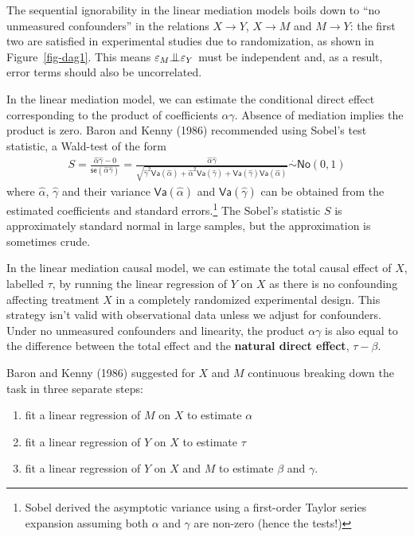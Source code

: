 \documentclass[
  11pt,
  letterpaper,
]{scrbook}
\providecommand{\tightlist}{%
  \setlength{\itemsep}{0pt}\setlength{\parskip}{0pt}}\usepackage{longtable,booktabs,array}
\theoremstyle{definition}
\theoremstyle{remark}
\begin{document}
The sequential ignorability in the linear mediation models boils down to
``no unmeasured confounders'' in the relations \(X \to Y\), \(X \to M\)
and \(M \to Y\): the first two are satisfied in experimental studies due
to randomization, as shown in Figure~\ref{fig-dag1}. This means
\(\varepsilon_M {\perp\mkern-10mu\perp} \varepsilon_Y\) must be
independent and, as a result, error terms should also be uncorrelated.

In the linear mediation model, we can estimate the conditional direct
effect corresponding to the product of coefficients \(\alpha\gamma\).
Absence of mediation implies the product is zero. Baron and Kenny (1986)
recommended using Sobel's test statistic, a Wald-test of the form
\begin{align*}
S  = \frac{\widehat{\alpha}\widehat{\gamma} - 0}{\mathsf{se}(\widehat{\alpha}\widehat{\gamma})} =  \frac{\widehat{\alpha}\widehat{\gamma}}{\sqrt{\widehat{\gamma}^2\mathsf{Va}(\widehat{\alpha}) + \widehat{\alpha}^2\mathsf{Va}(\widehat{\gamma}) + \mathsf{Va}(\widehat{\gamma})\mathsf{Va}(\widehat{\alpha})}} \stackrel{\cdot}{\sim}\mathsf{No}(0,1)
\end{align*} where \(\widehat{\alpha}\), \(\widehat{\gamma}\) and their
variance \(\mathsf{Va}(\widehat{\alpha})\) and
\(\mathsf{Va}(\widehat{\gamma})\) can be obtained from the estimated
coefficients and standard errors.\footnote{Sobel derived the asymptotic
  variance using a first-order Taylor series expansion assuming both
  \(\alpha\) and \(\gamma\) are non-zero (hence the tests!)} The Sobel's
statistic \(S\) is approximately standard normal in large samples, but
the approximation is sometimes crude.

In the linear mediation causal model, we can estimate the total causal
effect of \(X\), labelled \(\tau\), by running the linear regression of
\(Y\) on \(X\) as there is no confounding affecting treatment \(X\) in a
completely randomized experimental design. This strategy isn't valid
with observational data unless we adjust for confounders. Under no
unmeasured confounders and linearity, the product \(\alpha\gamma\) is
also equal to the difference between the total effect and the
\textbf{natural direct effect}, \(\tau - \beta\).

Baron and Kenny (1986) suggested for \(X\) and \(M\) continuous breaking
down the task in three separate steps:

\begin{enumerate}
\def\labelenumi{\arabic{enumi})}
\tightlist
\item
  fit a linear regression of \(M\) on \(X\) to estimate \(\alpha\)
\item
  fit a linear regression of \(Y\) on \(X\) to estimate \(\tau\)
\item
  fit a linear regression of \(Y\) on \(X\) and \(M\) to estimate
  \(\beta\) and \(\gamma\).
\end{enumerate}
\end{document}

